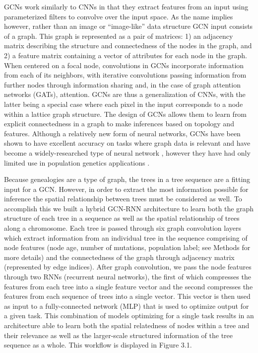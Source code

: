 GCNs work similarly to CNNs in that they extract features from an input using parameterized filters to convolve over the input space. As the name implies however, rather than an image or “image-like” data structure GCN input consists of a graph. This graph is represented as a pair of matrices: 1) an adjacency matrix describing the structure and connectedness of the nodes in the graph, and 2) a feature matrix containing a vector of attributes for each node in the graph. When centered on a focal node, convolutions in GCNs incorporate information from each of its neighbors, with iterative convolutions passing information from further nodes through information sharing and, in the case of graph attention networks (GATs), attention. GCNs are thus a generalization of CNNs, with the latter being a special case where each pixel in the input corresponds to a node within a lattice graph structure. The design of GCNs allows them to learn from explicit connectedness in a graph to make inferences based on topology and features. Although a relatively new form of neural networks, GCNs have been shown to have excellent accuracy on tasks where graph data is relevant and have become a widely-researched type of neural network \cite{zhouGraphNeuralNetworks2020}, however they have had only limited use in population genetics applications \cite{korfmannDeepLearningPopulation2023a,korfmannSimultaneousInferenceDemography2023}.

Because genealogies are a type of graph, the trees in a tree sequence are a fitting input for a GCN. However, in order to extract the most information possible for inference the spatial relationship between trees must be considered as well. To accomplish this we built a hybrid GCN-RNN architecture to learn both the graph structure of each tree in a sequence as well as the spatial relationship of trees along a chromosome. Each tree is passed through six graph convolution layers which extract information from an individual tree in the sequence comprising of node features (node age, number of mutations, population label; see Methods for more details) and the connectedness of the graph through adjacency matrix (represented by edge indices). After graph convolution, we pass the node features through two RNNs (recurrent neural networks), the first of which compresses the features from each tree into a single feature vector and the second compresses the features from each sequence of trees into a single vector. This vector is then used as input to a fully-connected network (MLP) that is used to optimize output for a given task. This combination of models optimizing for a single task results in an architecture able to learn both the spatial relatedness of nodes within a tree and their relevance as well as the larger-scale structured information of the tree sequence as a whole. This workflow is displayed in Figure 3.1.

